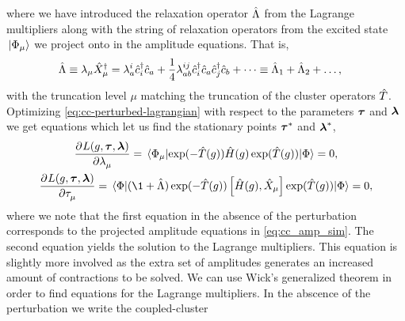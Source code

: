             where we have introduced the relaxation operator $\hat{\Lambda}$ from the
            Lagrange multipliers along with the string of relaxation operators
            from the excited state $\ket*{\Phi_{\mu}}$ we project onto in the
            amplitude equations.
            That is,
            \begin{align}
                \hat{\Lambda}
                &\equiv
                \lambda_{\mu}\hat{X}^{\dagger}_{\mu}
                = \lambda^{i}_{a}\hat{c}_{i}^{\dagger}\hat{c}_{a}
                + \frac{1}{4}\lambda^{ij}_{ab}\hat{c}_{i}^{\dagger}\hat{c}_{a}\hat{c}_{j}^{\dagger}\hat{c}_{b}
                + \dots
                \equiv
                \hat{\Lambda}_1 + \hat{\Lambda}_2 + \dots,
            \end{align}
            with the truncation level $\mu$ matching the truncation of the
            cluster operators $\hat{T}$.
            Optimizing \autoref{eq:cc-perturbed-lagrangian} with respect to the
            parameters $\boldsymbol{\tau}$ and $\boldsymbol{\lambda}$ we get equations
            which let us find the stationary points $\boldsymbol{\tau}^{*}$ and
            $\boldsymbol{\lambda}^{*}$,
            \begin{gather}
                \dpd[]{L(g, \vfg{\clustamp}, \vfg{\clustlamp})}
                {\clustlamp_{\mu}}
                = \mel*{\slat_{\mu}}{
                    \exponential(-\clust(g))
                    \hamil(g)
                    \exponential(\clust(g))
                }{\slat}
                = 0,
                \\
                \dpd[]{L(g, \vfg{\clustamp}, \vfg{\clustlamp})}
                {\clustamp_{\mu}}
                = \mel*{\slat}{
                    (\1 + \clustl)
                    \exponential(-\clust(g))
                    \com{\hamil(g)}{\hat{X}_{\mu}}
                    \exponential(\clust(g))
                }{\slat}
                = 0,
            \end{gather}
            where we note that the first equation in the absence of the
            perturbation corresponds to the projected amplitude equations in
            \autoref{eq:cc_amp_sim}.
            The second equation yields the solution to the Lagrange multipliers.
            This equation is slightly more involved as the extra set of
            amplitudes generates an increased amount of contractions to be
            solved.
            We can use Wick's generalized theorem in order to find equations for
            the Lagrange multipliers.
            In the abscence of the perturbation we write the coupled-cluster
